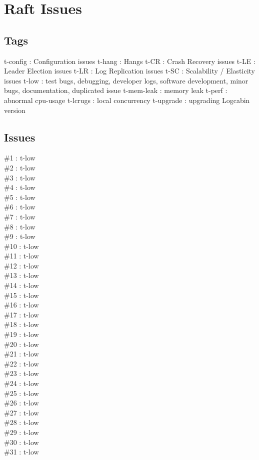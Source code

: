 \section{Raft Issues}
\subsection{Tags}
t-config : Configuration issues
t-hang : Hangs
t-CR : Crash Recovery issues
t-LE : Leader Election issues
t-LR : Log Replication issues
t-SC : Scalability / Elasticity issues
t-low : test bugs, debugging, developer logs, software development, minor bugs, documentation, duplicated issue
t-mem-leak : memory leak
t-perf : abnormal cpu-usage
t-lcrugs : local concurrency
t-upgrade : upgrading Logcabin version
\subsection{Issues}
\#1 : t-low\\
\#2 : t-low\\
\#3 : t-low\\
\#4 : t-low\\
\#5 : t-low\\
\#6 : t-low\\
\#7 : t-low\\
\#8 : t-low\\
\#9 : t-low\\
\#10 : t-low\\
\#11 : t-low\\
\#12 : t-low\\
\#13 : t-low\\
\#14 : t-low\\
\#15 : t-low\\
\#16 : t-low\\
\#17 : t-low\\
\#18 : t-low\\
\#19 : t-low\\
\#20 : t-low\\
\#21 : t-low\\
\#22 : t-low\\
\#23 : t-low\\
\#24 : t-low\\
\#25 : t-low\\
\#26 : t-low\\
\#27 : t-low\\
\#28 : t-low\\
\#29 : t-low\\
\#30 : t-low\\
\#31 : t-low\\
